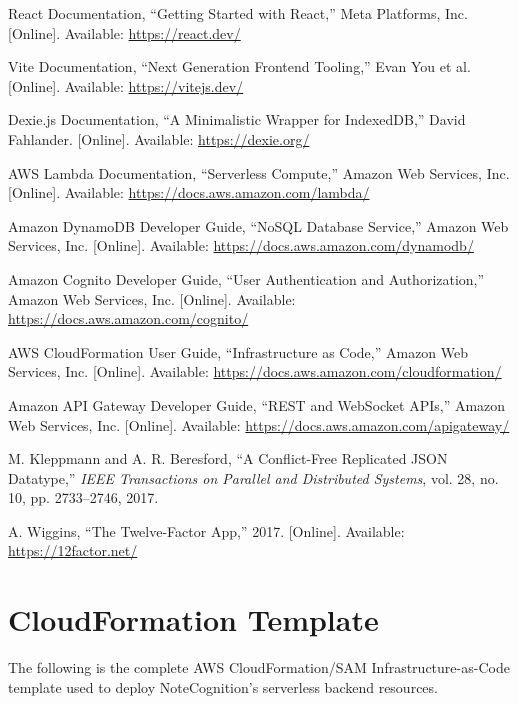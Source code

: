 \documentclass[12pt, a4paper, oneside]{report}
\begin{document}
\begin{enumerate}[label={[\arabic*]}]
    \item React Documentation, ``Getting Started with React,'' Meta Platforms, Inc. [Online]. Available: \url{https://react.dev/}
    \item Vite Documentation, ``Next Generation Frontend Tooling,'' Evan You et al. [Online]. Available: \url{https://vitejs.dev/}
    \item Dexie.js Documentation, ``A Minimalistic Wrapper for IndexedDB,'' David Fahlander. [Online]. Available: \url{https://dexie.org/}
    \item AWS Lambda Documentation, ``Serverless Compute,'' Amazon Web Services, Inc. [Online]. Available: \url{https://docs.aws.amazon.com/lambda/}
    \item Amazon DynamoDB Developer Guide, ``NoSQL Database Service,'' Amazon Web Services, Inc. [Online]. Available: \url{https://docs.aws.amazon.com/dynamodb/}
    \item Amazon Cognito Developer Guide, ``User Authentication and Authorization,'' Amazon Web Services, Inc. [Online]. Available: \url{https://docs.aws.amazon.com/cognito/}
    \item AWS CloudFormation User Guide, ``Infrastructure as Code,'' Amazon Web Services, Inc. [Online]. Available: \url{https://docs.aws.amazon.com/cloudformation/}
    \item Amazon API Gateway Developer Guide, ``REST and WebSocket APIs,'' Amazon Web Services, Inc. [Online]. Available: \url{https://docs.aws.amazon.com/apigateway/}
    \item M. Kleppmann and A. R. Beresford, ``A Conflict-Free Replicated JSON Datatype,'' \textit{IEEE Transactions on Parallel and Distributed Systems}, vol. 28, no. 10, pp. 2733--2746, 2017.
    \item A. Wiggins, ``The Twelve-Factor App,'' 2017. [Online]. Available: \url{https://12factor.net/}
\end{enumerate}

\appendix

\chapter{CloudFormation Template}
The following is the complete AWS CloudFormation/SAM Infrastructure-as-Code template used to deploy NoteCognition's serverless backend resources.

\end{document}
